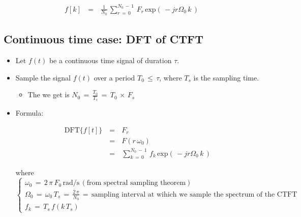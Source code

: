 \documentclass[12pt,a4paper]{book}
\begin{document}
\begin{equation}
\begin{array}{rcl}
f[k] \, &=&\, \displaystyle\frac{1}{N_0} \, \displaystyle\sum_{r \, = \, 0}^{N_0 \, - \, 1} \, F_r \, \text{exp} \left(\, -j r \Omega_0 \, k   \,\right)
\end{array}
\end{equation}

\newpage
\subsection{Continuous time case: DFT of CTFT}

\begin{itemize}

\item Let $f(t)$ be a continuous time signal of duration $\tau$.

\item Sample the signal $f(t)$ over a period $T_0 \, \leq \, \tau$, where $T_s$ is the sampling time. 

	\begin{itemize}
	\item The  we get is $N_0 \, = \, \displaystyle\frac{T_0}{T_s} \, = \, T_0 \, \times \, F_s$
	\end{itemize}

\item Formula:

\begin{equation}
\begin{array}{rcl}
\text{DFT}\{f[t]\} \, &=&\, F_r \\
						&=& \, F(r \, \omega_0) \\
					   &=&\, \displaystyle\sum_{k \, = \, 0}^{N_0 \, - \, 1} \, f_k \, \text{exp} \left(\, -j r \Omega_0 \, k   \,\right)
\end{array}
\end{equation}

where $\begin{cases}

\omega_0 \, = \, 2 \, \pi \, F_0 \, \text{rad/s} \, (\text{from spectral sampling theorem}) \\
\Omega_0 \, = \, \omega_0 \, T_s \, = \,   \displaystyle\frac{2 \, \pi}{N_0} \, = \, \text{sampling interval at wihich we sample the spectrum of the CTFT} \\
f_k \, = \, T_s \, f(k \, T_s)
\end{cases}$ 



\end{itemize}
\end{document}
